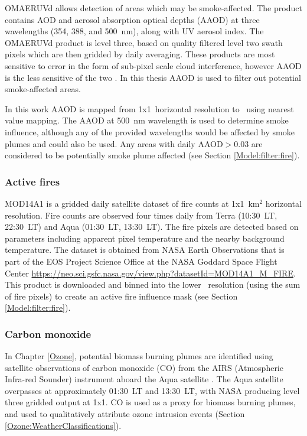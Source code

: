       
      OMAERUVd allows detection of areas which may be smoke-affected.
      The product contains AOD and aerosol absorption optical depths (AAOD) at three wavelengths (354, 388, and 500~nm), along with UV aerosol index.
      The OMAERUVd product is level three, based on quality filtered level two swath pixels which are then gridded by daily averaging.
      These products are most sensitive to error in the form of sub-pixel scale cloud interference, however AAOD is the less sensitive of the two \parencite{Ahn2008}.
      In this thesis AAOD is used to filter out potential smoke-affected areas.
      
      In this work AAOD is mapped from 1\degr x1\degr ~horizontal resolution to \highhr ~using nearest value mapping.
      The AAOD at 500~nm wavelength is used to determine smoke influence, although any of the provided wavelengths would be affected by smoke plumes and could also be used.
      Any areas with daily AAOD$>0.03$ are considered to be potentially smoke plume affected (see Section \ref{Model:filter:fire}).
    
    
    \subsubsection{Active fires}
      \label{Model:datasets:MOD14A1}
      MOD14A1 is a gridded daily satellite dataset of fire counts at 1x1~km$^2$ horizontal resolution.
      Fire counts are observed four times daily from Terra (10:30~LT, 22:30~LT) and Aqua (01:30~LT, 13:30~LT).
      The fire pixels are detected based on parameters including apparent pixel temperature and the nearby background temperature.
      The dataset is obtained from NASA Earth Observations that is part of the EOS Project Science Office at the NASA Goddard Space Flight Center \url{https://neo.sci.gsfc.nasa.gov/view.php?datasetId=MOD14A1_M_FIRE}.
      This product is downloaded and binned into the lower \highhr ~resolution (using the sum of fire pixels) to create an active fire influence mask (see Section \ref{Model:filter:fire}).
      
    \subsubsection{Carbon monoxide}
      \label{Model:datasets:AIRS}
      
      In Chapter \ref{Ozone}, potential biomass burning plumes are identified using satellite observations of carbon monoxide (CO) from the AIRS (Atmospheric Infra-red Sounder) instrument aboard the Aqua satellite \parencite{AIRS3STD}.
      The Aqua satellite overpasses at approximately 01:30~LT and 13:30~LT, with NASA producing level three gridded output at 1\degr x1\degr .
      CO is used as a proxy for biomass burning plumes, and used to qualitatively attribute ozone intrusion events (Section \ref{Ozone:WeatherClassifications}).
      

